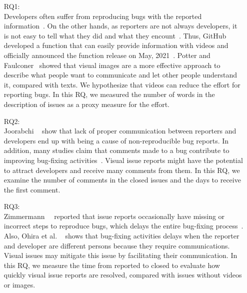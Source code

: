 \begin{itemize}
	\item[RQ1:] \textbf{\RQone{}}\\
	Developers often suffer from reproducing bugs with the reported information~\citep{DBLP:conf/sigsoft/ChaparroLZMPMBN17}\citep{DBLP:conf/icsm/0001KC20}\citep{zimmermann2010TSE}. 
	On the other hands, as reporters are not always developers, it is not easy to tell what they did and what they encount~\citep{DBLP:conf/sigsoft/ChaparroBLMMPPN19}. Thus, GitHub developed a function that can easily provide information with videos and officially announced the function release on May, 2021~\citep{github-video-blog}. Potter and Faulconer~\citep{POTTER1975} showed that visual images are a more effective approach to describe what people want to communicate and let other people understand it, compared with texts. We hypothesize that videos can reduce the effort for reporting bugs. In this RQ, we measured the number of words in the description of issues as a proxy measure for the effort. 
	\item[RQ2:] \textbf{\RQtwo{}}\\
	Joorabchi \et~\citep{DBLP:conf/msr/JoorabchiMM14} show that lack of proper communication between reporters and developers end up with being a cause of non-reproducible bug reports. In addition, many studies claim that comments made to a bug contribute to improving bug-fixing activities~\citep{DBLP:conf/icse/GigerPG10}\citep{DBLP:conf/msr/Panjer07}\citep{zhang2012WCRE}.  Visual issue reports might have the potential to attract developers and receive many comments from them. In this RQ, we examine the number of comments in the closed issues and the days to receive the first comment.
	\item[RQ3:] \textbf{\RQthree{}}\\
	Zimmermann~\et~\citep{zimmermann2010TSE} reported that issue reports occasionally have missing or incorrect steps to reproduce bugs, which delays the entire bug-fixing process~\citep{github-video-blog}. Also, Ohira et al. ~\citep{DBLP:conf/icsm/OhiraHOM12} shows that bug-fixing activities delays when the reporter and developer are different persons because they require communications. Visual issues may mitigate this issue by facilitating their communication. In this RQ, we measure the time from reported to closed to evaluate how quickly visual issue reports are resolved, compared with issues without videos or images. 
\end{itemize}

